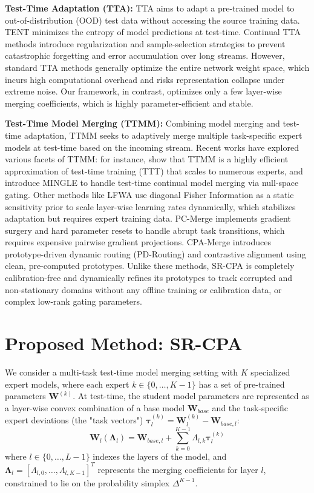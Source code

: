 \documentclass{article}
\theoremstyle{plain}
\theoremstyle{definition}
\theoremstyle{remark}
\begin{document}
\textbf{Test-Time Adaptation (TTA):} TTA aims to adapt a pre-trained model to out-of-distribution (OOD) test data without accessing the source training data. TENT \cite{wang2020tent} minimizes the entropy of model predictions at test-time. Continual TTA methods \cite{wang2022continual, gong2022note, niu2023towards} introduce regularization and sample-selection strategies to prevent catastrophic forgetting and error accumulation over long streams. However, standard TTA methods generally optimize the entire network weight space, which incurs high computational overhead and risks representation collapse under extreme noise. Our framework, in contrast, optimizes only a few layer-wise merging coefficients, which is highly parameter-efficient and stable.

\textbf{Test-Time Model Merging (TTMM):} Combining model merging and test-time adaptation, TTMM seeks to adaptively merge multiple task-specific expert models at test-time based on the incoming stream. Recent works have explored various facets of TTMM: for instance, \cite{bertolissi2025local} show that TTMM is a highly efficient approximation of test-time training (TTT) that scales to numerous experts, and \cite{qiu2025mingle} introduce MINGLE to handle test-time continual model merging via null-space gating. 
Other methods like LFWA \cite{lfwa2025} use diagonal Fisher Information as a static sensitivity prior to scale layer-wise learning rates dynamically, which stabilizes adaptation but requires expert training data. PC-Merge \cite{pcmerge2025} implements gradient surgery and hard parameter resets to handle abrupt task transitions, which requires expensive pairwise gradient projections. CPA-Merge \cite{cpamerge2025} introduces prototype-driven dynamic routing (PD-Routing) and contrastive alignment using clean, pre-computed prototypes. Unlike these methods, SR-CPA is completely calibration-free and dynamically refines its prototypes to track corrupted and non-stationary domains without any offline training or calibration data, or complex low-rank gating parameters.

\section{Proposed Method: SR-CPA}
\label{sec:method}

We consider a multi-task test-time model merging setting with $K$ specialized expert models, where each expert $k \in \{0, \ldots, K-1\}$ has a set of pre-trained parameters $\boldsymbol{W}^{(k)}$. At test-time, the student model parameters are represented as a layer-wise convex combination of a base model $\boldsymbol{W}_{base}$ and the task-specific expert deviations (the "task vectors") $\boldsymbol{\tau}_l^{(k)} = \boldsymbol{W}_l^{(k)} - \boldsymbol{W}_{base, l}$:
\begin{equation}
    \boldsymbol{W}_l(\boldsymbol{\Lambda}_l) = \boldsymbol{W}_{base, l} + \sum_{k=0}^{K-1} \Lambda_{l,k} \boldsymbol{\tau}_l^{(k)}
\end{equation}
where $l \in \{0, \dots, L-1\}$ indexes the layers of the model, and $\boldsymbol{\Lambda}_l = [\Lambda_{l,0}, \dots, \Lambda_{l,K-1}]^T$ represents the merging coefficients for layer $l$, constrained to lie on the probability simplex $\Delta^{K-1}$.
\end{document}
